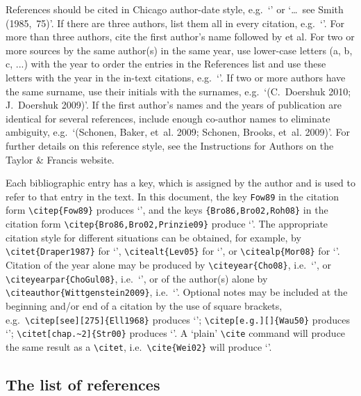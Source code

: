 \documentclass[]{interact}
\theoremstyle{plain}%
\theoremstyle{definition}
\theoremstyle{remark}
\begin{document}
References should be cited in Chicago author-date style, e.g.\ `\citep{Alb05,Gre08,Sch87}' or `\ldots~see Smith (1985,~75)'. If there are three authors, list them all in every citation, e.g.\ `\citep{Nowacki20}'. For more than three authors, cite the first author's name followed by et al. For two or more sources by the same author(s) in the same year, use lower-case letters (a, b, c, ...) with the year to order the entries in the References list and use these letters with the year in the in-text citations, e.g.\ `\citep{FogEHPD04,FogJEE04}'. If two or more authors have the same surname, use their initials with the surnames, e.g.\ `(C.~Doershuk 2010; J.~Doershuk 2009)'. If the first author's names and the years of publication are identical for several references, include enough co-author names to eliminate ambiguity, e.g.\ `(Schonen, Baker, et~al. 2009; Schonen, Brooks, et~al. 2009)'. For further details on this reference style, see the Instructions for Authors on the Taylor \& Francis website.

Each bibliographic entry has a key, which is assigned by the author and is used to refer to that entry in the text. In this document, the key \verb"Fow89" in the citation form \verb"\citep{Fow89}" produces `\citep{Fow89}', and the keys \verb"{Bro86,Bro02,Roh08}" in the citation form \verb"\citep{Bro86,Bro02,Prinzie09}" produce `\citep{Bro86,Bro02,Prinzie09}'. The appropriate citation style for different situations can be obtained, for example, by \verb"\citet{Draper1987}" for `\citet{Draper1987}', \verb"\citealt{Lev05}" for `\citealt{Lev05}', or \verb"\citealp{Mor08}" for `\citealp{Mor08}'. Citation of the year alone may be produced by \verb"\citeyear{Cho08}", i.e.\ `\citeyear{Cho08}', or \verb"\citeyearpar{ChoGul08}", i.e.\ `\citeyearpar{ChoGul08}', or of the author(s) alone by \verb"\citeauthor{Wittgenstein2009}", i.e.\ `\citeauthor{Wittgenstein2009}'. Optional notes may be included at the beginning and/or end of a citation by the use of square brackets, e.g.\ \verb"\citep[see][275]{Ell1968}" produces `\citep[see][275]{Ell1968}'; \verb"\citep[e.g.][]{Wau50}" produces `\citep[e.g.][]{Wau50}'; \verb"\citet[chap.~2]{Str00}" produces `\citet[chap.~2]{Str00}'. A `plain' \verb"\cite" command will produce the same result as a \verb"\citet", i.e.\ \verb"\cite{Wei02}" will produce `\cite{Wei02}'.


\subsection{The list of references}
\end{document}
